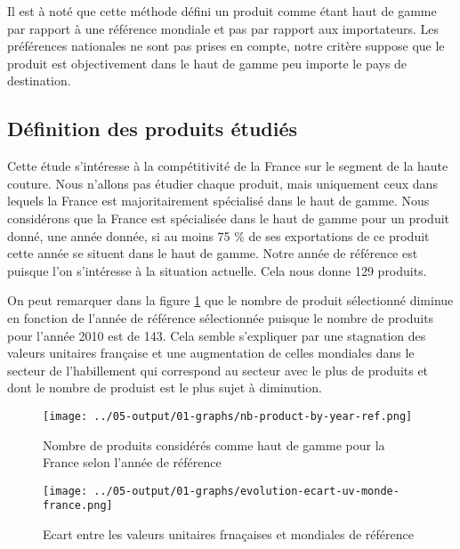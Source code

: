 \documentclass[french,10pt,a4paper]{article}
\begin{document}
Il est à noté que cette méthode défini un produit comme étant haut de gamme par rapport à une référence mondiale et pas par rapport aux importateurs. Les préférences nationales ne sont pas prises en compte, notre critère suppose que le produit est \og objectivement\fg{} dans le haut de gamme peu importe le pays de destination. %

\subsection{Définition des produits étudiés}

Cette étude s'intéresse à la compétitivité de la France sur le segment de la haute couture. Nous n'allons pas étudier chaque produit, mais uniquement ceux dans lequels la France est majoritairement spécialisé dans le haut de gamme. Nous considérons que la France est spécialisée dans le haut de gamme pour un produit donné, une année donnée, si au moins 75 \% de ses exportations de ce produit cette année se situent dans le haut de gamme. Notre année de référence est  puisque l'on s'intéresse à la situation actuelle. Cela nous donne 129 produits.

On peut remarquer dans la figure \ref{fig:nb-products-by-year-ref} que le nombre de produit sélectionné diminue en fonction de l'année de référence sélectionnée puisque le nombre de produits pour l'année 2010 est de 143. Cela semble s'expliquer par une stagnation des valeurs unitaires française et une augmentation de celles mondiales dans le secteur de l'habillement qui correspond au secteur avec le plus de produits et dont le nombre de produist est le plus sujet à diminution. 





\begin{figure}[!h]
  \centering
  \texttt{[image: ../05-output/01-graphs/nb-product-by-year-ref.png]}
  \caption{Nombre de produits considérés comme haut de gamme pour la France selon l'année de référence}
  \label{fig:nb-products-by-year-ref}
\end{figure}

\begin{figure}[!h]
  \centering
  \texttt{[image: ../05-output/01-graphs/evolution-ecart-uv-monde-france.png]}
  \caption{Ecart entre les valeurs unitaires frnaçaises et mondiales de référence}

\end{figure}
\end{document}
